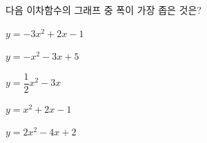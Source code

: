 다음 이차함수의 그래프 중 폭이 가장 좁은 것은?
\begin{choicesii}{\rule[-3ex]{0pt}{8ex}$y=-3x^2+2x-1$}{\rule[-3ex]{0pt}{8ex}$y=-x^2-3x+5$}{\rule[-3ex]{0pt}{8ex}$y=\dfrac{1}{2}x^2-3x$}{\rule[-3ex]{0pt}{8ex}$y=x^2+2x-1$}{\rule[-3ex]{0pt}{8ex}$y=2x^2-4x+2$}\end{choicesii}
